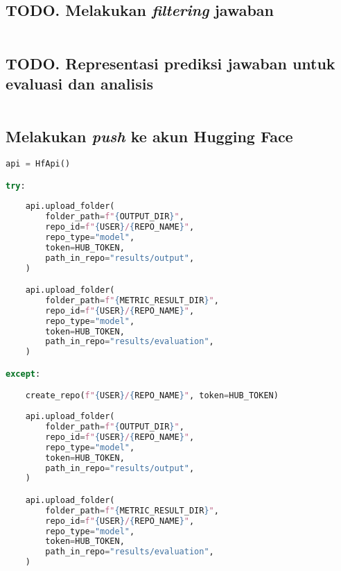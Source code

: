 \subsection{TODO. Melakukan \emph{filtering} jawaban}
\begin{lstlisting}[language=Python, caption=Melakukan \emph{filtering} jawaban]

\end{lstlisting}

\subsection{TODO. Representasi prediksi jawaban untuk evaluasi dan analisis}
\begin{lstlisting}[language=Python, caption=Representasi prediksi jawaban untuk evaluasi dan analisis]

\end{lstlisting}

\subsection{Melakukan \emph{push} ke akun Hugging Face}
\begin{lstlisting}[language=Python, caption=Melakukan \emph{push} ke akun Hugging Face]
api = HfApi()

try:
    
    api.upload_folder(
        folder_path=f"{OUTPUT_DIR}",
        repo_id=f"{USER}/{REPO_NAME}",
        repo_type="model",
        token=HUB_TOKEN,
        path_in_repo="results/output",
    )

    api.upload_folder(
        folder_path=f"{METRIC_RESULT_DIR}",
        repo_id=f"{USER}/{REPO_NAME}",
        repo_type="model",
        token=HUB_TOKEN,
        path_in_repo="results/evaluation",
    )

except:

    create_repo(f"{USER}/{REPO_NAME}", token=HUB_TOKEN)
    
    api.upload_folder(
        folder_path=f"{OUTPUT_DIR}",
        repo_id=f"{USER}/{REPO_NAME}",
        repo_type="model",
        token=HUB_TOKEN,
        path_in_repo="results/output",
    )

    api.upload_folder(
        folder_path=f"{METRIC_RESULT_DIR}",
        repo_id=f"{USER}/{REPO_NAME}",
        repo_type="model",
        token=HUB_TOKEN,
        path_in_repo="results/evaluation",
    )
\end{lstlisting}

